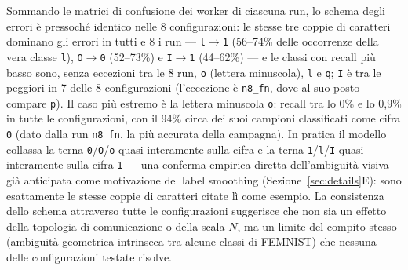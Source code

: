 Sommando le matrici di confusione dei worker di ciascuna run, lo schema degli
errori è pressoché identico nelle 8 configurazioni: le stesse tre coppie di
caratteri dominano gli errori in tutti e 8 i run — \texttt{l}$\to$\texttt{1}
(56--74\% delle occorrenze della vera classe \texttt{l}),
\texttt{O}$\to$\texttt{0} (52--73\%) e \texttt{I}$\to$\texttt{1}
(44--62\%) — e le classi con recall più basso sono, senza eccezioni tra le
8 run, \texttt{o} (lettera minuscola), \texttt{l} e \texttt{q}; \texttt{I}
è tra le peggiori in 7 delle 8 configurazioni (l'eccezione è
\texttt{n8\_fn}, dove al suo posto compare \texttt{p}).
Il caso più estremo è la lettera minuscola \texttt{o}: recall tra lo 0\% e
lo 0,9\% in tutte le configurazioni, con il 94\% circa dei suoi campioni
classificati come cifra \texttt{0} (dato dalla run \texttt{n8\_fn}, la più
accurata della campagna). In pratica il modello collassa la terna
\texttt{0}/\texttt{O}/\texttt{o} quasi interamente sulla cifra e la terna
\texttt{1}/\texttt{l}/\texttt{I} quasi interamente sulla cifra \texttt{1} —
una conferma empirica diretta dell'ambiguità visiva già anticipata come
motivazione del label smoothing (Sezione~\ref{sec:details}E): sono
esattamente le stesse coppie di caratteri citate lì come esempio. La
consistenza dello schema attraverso tutte le configurazioni suggerisce che
non sia un effetto della topologia di comunicazione o della scala $N$, ma
un limite del compito stesso (ambiguità geometrica intrinseca tra alcune
classi di FEMNIST) che nessuna delle configurazioni testate risolve.
